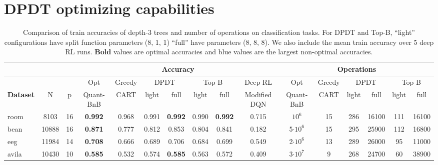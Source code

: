 \section{DPDT optimizing capabilities}
\begin{table}[ht]
    \centering
    \tiny
    \caption{Comparison of train accuracies of depth-3 trees and number of operations on classification tasks. For DPDT and Top-B, ``light'' configurations have split function parameters (8, 1, 1) ``full'' have parameters (8, 8, 8). We also include the mean train accuracy over 5 deep RL runs. \textbf{Bold} values are optimal accuracies and {\color{blue} blue} values are the largest non-optimal accuracies.}
    \label{tab:tree_comparison_combined}
    \begin{tabular}{l|cc||cc|cc|cc|c||cc|cc|cc}
    \toprule
    & & & \multicolumn{7}{c||}{\textbf{Accuracy}} & \multicolumn{6}{c}{\textbf{Operations}}\\
    \midrule
    & & & Opt & Greedy & \multicolumn{2}{c|}{DPDT} & \multicolumn{2}{c|}{Top-B} & \multicolumn{1}{c||}{Deep RL} & Opt & Greedy & \multicolumn{2}{c|}{DPDT} & \multicolumn{2}{c}{Top-B}\\
    \textbf{Dataset} & N & p & Quant-BnB & CART & light & full & light & full & Modified DQN & Quant-BnB & CART & light & full & light & full \\
    \midrule
    room & 8103 & 16 & \textbf{0.992} & 0.968 & \color{blue} 0.991 & \textbf{0.992} & 0.990 & \textbf{0.992} & 0.715 &$10^6$ & 15 & 286 & 16100 & 111 & 16100 \\
    bean & 10888 & 16  & \textbf{0.871} & 0.777 & 0.812 & \color{blue} 0.853 & 0.804 & 0.841 & 0.182 & 5$\cdot 10^6$ & 15 & 295 & 25900 & 112 & 16800 \\
    eeg & 11984 & 14  & \textbf{0.708} & 0.666 & 0.689 & \color{blue} 0.706 & 0.684 & 0.699 & 0.549 & 2$\cdot 10^6$ & 13 & 289 & 26000 & 95 & 11000 \\
    avila & 10430 & 10  & \textbf{0.585} & 0.532 & \color{blue}0.574 & \textbf{0.585} & 0.563 & 0.572 & 0.409 & 3$\cdot 10^7$ & 9 & 268 & 24700 & 60 & 38900 \\

\end{tabular}
\end{table}
